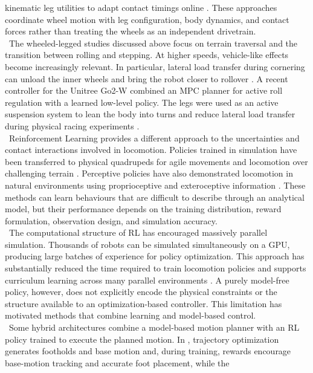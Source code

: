 kinematic leg utilities to adapt contact timings online
\cite{wheeled_whole_body_mpc}. These approaches coordinate wheel motion with
leg configuration, body dynamics, and contact forces rather than treating the
wheels as an independent drivetrain.\\
\
The wheeled-legged studies discussed above focus on terrain traversal and the
transition between rolling and stepping. At higher speeds, vehicle-like
effects become increasingly relevant. In particular, lateral load transfer
during cornering can unload the inner wheels and bring the robot closer to
rollover \cite{racing}. A recent controller for the Unitree
Go2-W combined an MPC planner for active roll regulation with a learned
low-level policy. The legs were used as an active suspension system to lean the
body into turns and reduce lateral load transfer during physical racing
experiments \cite{racing}.\\
\
Reinforcement Learning provides a different approach to the uncertainties and
contact interactions involved in locomotion. Policies trained in simulation
have been transferred to physical quadrupeds for agile movements and locomotion
over challenging terrain \cite{agile_motor_skills,challenging_terrain}.
Perceptive policies have also demonstrated locomotion in natural environments
using proprioceptive and exteroceptive information
\cite{perceptive_rl}. These methods can learn behaviours that are difficult to
describe through an analytical model, but their performance depends on the
training distribution, reward formulation, observation design, and simulation
accuracy.\\
\
The computational structure of RL has encouraged massively parallel
simulation. Thousands of robots can be simulated simultaneously on a GPU,
producing large batches of experience for policy optimization. This approach
has substantially reduced the time required to train locomotion policies and
supports curriculum learning across many parallel environments
\cite{parallel_rl}. A purely model-free policy, however, does not explicitly
encode the physical constraints or the structure available to an
optimization-based controller. This limitation has motivated methods that
combine learning and model-based control.\\
\
Some hybrid architectures combine a model-based motion planner with an RL
policy trained to execute the planned motion. In \cite{deep_tracking},
trajectory optimization generates footholds and base motion and, during training,
rewards encourage base-motion tracking and accurate foot placement, while the
